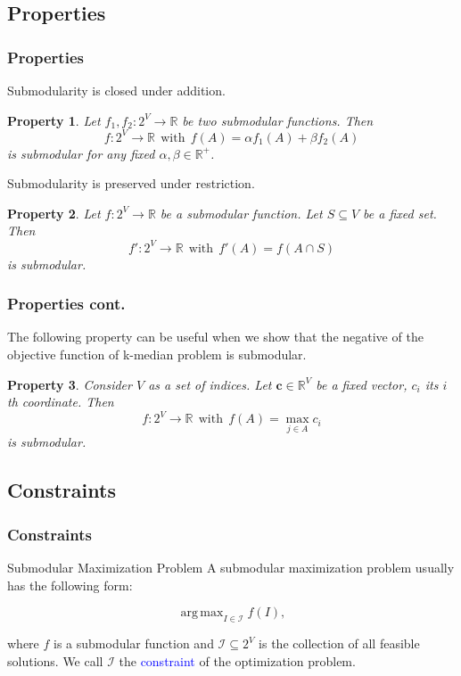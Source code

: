 \documentclass{beamer}
\newtheorem{property}{Property}
\newcommand{\calI}{\mathcal{I}}
\newcommand{\emRed}[1][]{\textcolor{blue} #1}
\newcommand{\bbR}{\mathbb{R}}
\DeclareMathOperator*{\argmax}{arg\,max}
\begin{document}
\subsection{Properties}
\begin{frame}
\frametitle{Properties}

Submodularity is closed under addition.
\begin{property}
  \label{prop:addition}
  Let $f_1, f_2: 2^V \rightarrow \bbR$ be two submodular functions. Then 
  $$f: 2^V\rightarrow \bbR~~\text{with}~~ f(A) = \alpha f_1(A) + \beta f_2(A)$$ 
is submodular for any fixed $\alpha, \beta \in \bbR^+$.
\end{property}

Submodularity is preserved under restriction.
\begin{property}
  \label{prop:restriction}
  Let $f: 2^V \rightarrow \bbR$ be a submodular function. Let $S\subseteq V$ be a fixed set. Then
$$f':2^V \rightarrow \bbR~~\text{with}~~f'(A) = f(A\cap S)$$
is submodular.
\end{property}
\end{frame}


\begin{frame}
\frametitle{Properties cont.}
The following property can be useful when we show that the negative of the objective function of k-median problem is submodular.
\begin{property}
  \label{prop:max}
Consider $V$ as a set of indices. Let $\mathbf{c}\in \bbR^V$ be a fixed vector, $c_i$ its $i$th coordinate. Then 
$$f:2^V \rightarrow \bbR~~\text{with}~~ f(A) = \max_{j\in A}c_i$$ 
is submodular.
\end{property}
\end{frame}



\subsection{Constraints}
\begin{frame}
\frametitle{Constraints}
\begin{block}{Submodular Maximization Problem}
A submodular maximization problem usually has the following form:

\begin{equation}
  \label{eq:optimization}
  \argmax_{I\in\calI} f(I),
\end{equation}
\end{block}
where $f$ is a submodular function and $\calI \subseteq 2^V$ is the collection of all feasible solutions. We call $\calI$ the \emRed{constraint} of the optimization problem.
\end{frame}
\end{document}
